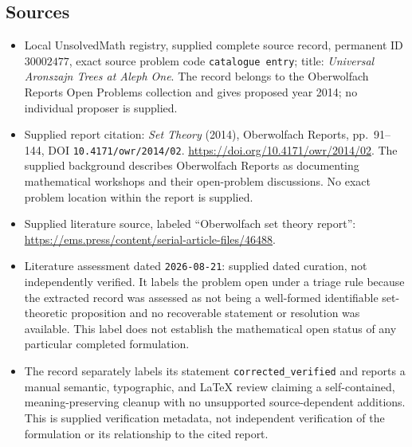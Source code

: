 \documentclass[11pt]{article}
\begin{document}
\subsection{Sources}
\begin{itemize}
\item Local UnsolvedMath registry, supplied complete source record, permanent ID \(30002477\), exact source problem code \texttt{catalogue entry}; title: \emph{Universal Aronszajn Trees at Aleph One}. The record belongs to the Oberwolfach Reports Open Problems collection and gives proposed year 2014; no individual proposer is supplied.
\item Supplied report citation: \emph{Set Theory} (2014), Oberwolfach Reports, pp.~91--144, DOI \texttt{10.4171/owr/2014/02}. \url{https://doi.org/10.4171/owr/2014/02}. The supplied background describes Oberwolfach Reports as documenting mathematical workshops and their open-problem discussions. No exact problem location within the report is supplied.
\item Supplied literature source, labeled ``Oberwolfach set theory report'': \url{https://ems.press/content/serial-article-files/46488}.
\item Literature assessment dated \texttt{2026-08-21}: supplied dated curation, not independently verified. It labels the problem open under a triage rule because the extracted record was assessed as not being a well-formed identifiable set-theoretic proposition and no recoverable statement or resolution was available. This label does not establish the mathematical open status of any particular completed formulation.
\item The record separately labels its statement \texttt{corrected\_verified} and reports a manual semantic, typographic, and LaTeX review claiming a self-contained, meaning-preserving cleanup with no unsupported source-dependent additions. This is supplied verification metadata, not independent verification of the formulation or its relationship to the cited report.
\end{itemize}
\end{document}
